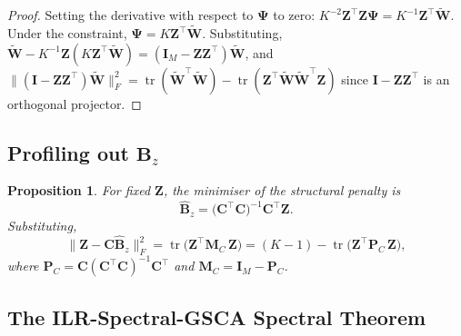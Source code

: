 \documentclass{article}
\newtheorem{proposition}[theorem]{Proposition}
\DeclareMathOperator{\tr}{tr}
\begin{document}
\begin{proof}
Setting the derivative with respect to $\boldsymbol{\Psi}$ to zero:
$K^{-2}\mathbf{Z}^{\!\top}\mathbf{Z}\boldsymbol{\Psi}
 = K^{-1}\mathbf{Z}^{\!\top}\widetilde{\mathbf{W}}$.
Under the constraint, $\boldsymbol{\Psi}=K\mathbf{Z}^{\!\top}
\widetilde{\mathbf{W}}$. Substituting,
$\widetilde{\mathbf{W}} - K^{-1}\mathbf{Z}(K\mathbf{Z}^{\!\top}
\widetilde{\mathbf{W}})
= (\mathbf{I}_M - \mathbf{Z}\mathbf{Z}^{\!\top})\widetilde{\mathbf{W}}$,
and
$\|(\mathbf{I}-\mathbf{Z}\mathbf{Z}^{\!\top})\widetilde{\mathbf{W}}\|_F^2
= \tr(\widetilde{\mathbf{W}}^{\!\top}\widetilde{\mathbf{W}})
  - \tr(\mathbf{Z}^{\!\top}\widetilde{\mathbf{W}}
    \widetilde{\mathbf{W}}^{\!\top}\mathbf{Z})$
since $\mathbf{I}-\mathbf{Z}\mathbf{Z}^{\!\top}$ is an orthogonal
projector.
\end{proof}

\subsection{Profiling out
\texorpdfstring{$\mathbf{B}_z$}{Bz}}
\label{subsec:profile_Bz}

\begin{proposition}
\label{prop:Bz_profile}
For fixed $\mathbf{Z}$, the minimiser of the structural penalty is
\begin{equation}
  \hat{\mathbf{B}}_z
  = \bigl(\mathbf{C}^{\!\top}\mathbf{C}\bigr)^{-1}
    \mathbf{C}^{\!\top}\mathbf{Z}.
  \label{eq:Bz_hat}
\end{equation}
Substituting,
\begin{equation}
  \bigl\|\mathbf{Z}
    - \mathbf{C}\hat{\mathbf{B}}_z\bigr\|_F^2
  = \tr\!\bigl(
      \mathbf{Z}^{\!\top}\mathbf{M}_C\,\mathbf{Z}
    \bigr)
  = (K{-}1) - \tr\!\bigl(
      \mathbf{Z}^{\!\top}\mathbf{P}_C\,\mathbf{Z}
    \bigr),
  \label{eq:structural_profiled}
\end{equation}
where $\mathbf{P}_C = \mathbf{C}(\mathbf{C}^{\!\top}\mathbf{C})^{-1}
\mathbf{C}^{\!\top}$ and
$\mathbf{M}_C = \mathbf{I}_M - \mathbf{P}_C$.
\end{proposition}

\subsection{The ILR-Spectral-GSCA Spectral Theorem}
\label{subsec:spectral}
\end{document}
